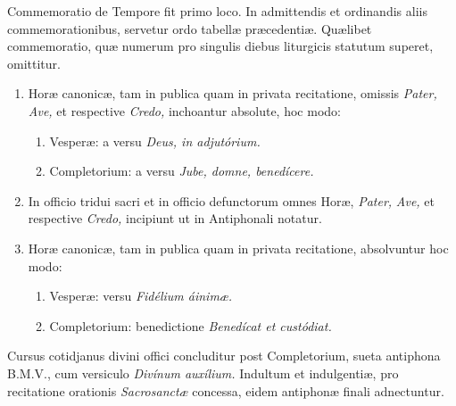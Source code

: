 \documentclass[vesperale_romanum.tex]{subfiles}
\begin{document}
Commemoratio de Tempore fit primo loco. In admittendis et ordinandis aliis commemorationibus, servetur ordo tabellæ præcedentiæ. Quælibet commemoratio, quæ numerum pro singulis diebus liturgicis statutum superet, omittitur.


\begin{enumerate}[nosep]
\item Horæ canonicæ, tam in publica quam in privata recitatione, omissis \textit{Pater,} \textit{Ave,} et respective \textit{Credo,} inchoantur absolute, hoc modo:

\begin{enumerate}[nosep,label=\null]
\item Vesperæ: a versu \textit{Deus, in adjutórium.}
\item Completorium: a versu \tinyhspace\textit{Jube, domne, benedícere.}
\end{enumerate}

\item In officio tridui sacri et in officio defunctorum omnes Horæ, \textit{Pater,} \textit{Ave,} et respective \textit{Credo,} incipiunt ut in Antiphonali notatur.

\item Horæ canonicæ, tam in publica quam in privata recitatione, absolvuntur hoc modo:
\begin{enumerate}[nosep,label=\null]
\item Vesperæ: versu \textit{Fidélium áinimæ.}

\item Completorium: benedictione \textit{Benedícat et custódiat.}
\end{enumerate}
\end{enumerate}


Cursus cotidjanus divini offici concluditur post Completorium, sueta antiphona B.M.V., cum versiculo \textit{Divínum auxílium.} Indultum et indulgentiæ, pro recitatione orationis \textit{Sacrosanctæ} concessa, eidem antiphonæ finali adnectuntur.

\end{document}
